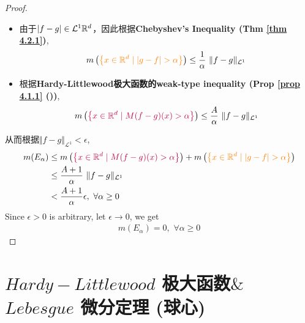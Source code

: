 \begin{thm}
\begin{proof}
			\vspace{2em}
			
			\begin{itemize}
				\item 由于$\left| f - g \right| \in \mathcal{L}^{1}{\mathbb{R}^d}$，因此根据\textbf{Chebyshev's Inequality (Thm \ref{thm 4.2.1})},
				\begin{align}
					m\left( \textcolor{orange}{\left\{ x \in \mathbb{R}^d \mid \left| g - f \right| > \alpha \right\}} \right)
					\leq \frac{1}{\alpha} \,\, \Vert f - g \Vert_{\mathcal{L}^1}
				\end{align}
				
				\vspace{1em}
				
				\item 根据\textbf{Hardy-Littlewood极大函数的weak-type inequality (Prop \ref{prop 4.1.1} ())},
				\begin{align}
					m\left( \textcolor{purple}{\left\{ x \in \mathbb{R}^d \mid M(f - g)(x) > \alpha \right\}} \right)
					\leq \frac{A}{\alpha} \,\, \Vert f - g \Vert_{\mathcal{L}^1}
				\end{align}
			\end{itemize}
		
			\vspace{2em}
			
			从而根据$\Vert f - g \Vert_{\mathcal{L}^1} < \epsilon$,
			\begin{align}
				m(E_\alpha)
				&\leq m\left( \textcolor{purple}{\left\{ x \in \mathbb{R}^d \mid M(f - g)(x) > \alpha \right\}} \right)
				+ m\left( \textcolor{orange}{\left\{ x \in \mathbb{R}^d \mid \left| g - f \right| > \alpha \right\}} \right) \\
				&\leq \frac{A + 1}{\alpha} \,\, \Vert f - g \Vert_{\mathcal{L}^1} \\
				&< \frac{A + 1}{\alpha} \epsilon , \,\, \forall \alpha \geq 0
			\end{align}
			Since $\epsilon > 0$ is arbitrary, let $\epsilon \to 0$, we get
			\begin{align}
				m(E_\alpha) = 0 , \,\, \forall \alpha \geq 0
			\end{align}
		\end{proof}
	\end{thm}

\newpage
\section{$Hardy-Littlewood$ 极大函数$\&$ $Lebesgue$ 微分定理 (球心)}
